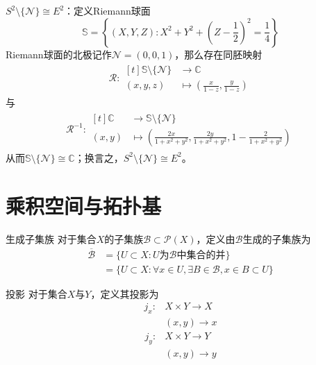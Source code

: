 \documentclass[lang = cn, scheme = chinese, thmcnt = section, usesamecnt]{elegantbook}
\newcommand{\C}{\mathbb{C}}  		   %
\newcommand{\sub}{\subset}             %
\begin{document}
\begin{example}
	$S^2\setminus \{ \mathcal{N} \} \cong E^2$：定义Riemann球面
	$$
	\mathbb{S}=\left\{ (X,Y,Z):X^2+Y^2+\left(Z-\frac{1}{2}\right)^2=\frac{1}{4} \right\}
	$$
	Riemann球面的北极记作$\mathcal{N}=(0,0,1)$，那么存在同胚映射
	\begin{align*}
		\mathcal{R}:\begin{aligned}[t]
			\mathbb{S}\setminus \{ \mathcal{N} \} &\longrightarrow \C\\
			(x,y,z) &\longmapsto \left(\frac{x}{1-z},\frac{y}{1-z}\right)
		\end{aligned}
	\end{align*}
	与
	\begin{align*}
		\mathcal{R}^{-1}:\begin{aligned}[t]
			\C &\longrightarrow \mathbb{S}\setminus \{ \mathcal{N} \}\\
			(x,y) &\longmapsto \left( \frac{2x}{1+x^2+y^2},\frac{2y}{1+x^2+y^2},1-\frac{2}{1+x^2+y^2} \right)
		\end{aligned}
	\end{align*}
	从而$\mathbb{S}\setminus \{ \mathcal{N} \} \cong \C$；换言之，$S^2\setminus \{ \mathcal{N} \} \cong E^2$。
\end{example}

\section{乘积空间与拓扑基}

\begin{definition}{生成子集族}
	对于集合$X$的子集族$\mathscr{B}\sub\mathscr{P}(X)$，定义由$\mathscr{B}$生成的子集族为
	\begin{align*}
		\overline{\mathscr{B}}&=\{ U\sub X:U\text{为}\mathscr{B}\text{中集合的并} \}\\
		&=\{ U\sub X:\forall x\in U,\exists B\in\mathscr{B},x\in B\sub U \}
	\end{align*}
\end{definition}

\begin{definition}{投影}
	对于集合$X$与$Y$，定义其投影为
	\begin{align*}
		j_x: & X\times Y\to X\\
		& (x,y)\to x
	\end{align*}
	\begin{align*}
		j_y: & X\times Y\to Y\\
		& (x,y)\to y
	\end{align*}
\end{definition}
\end{document}
